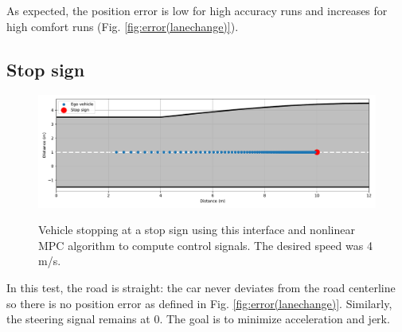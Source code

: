 \documentclass[letterpaper, 10 pt, conference]{ieeeconf}  %
\begin{document}
 As expected, the position error is low for high accuracy runs and increases for high comfort runs (Fig. \ref{fig:error(lanechange)}).
 
 \subsection{Stop sign}
 
 
\begin{figure}[h!]
	\centering
	\includegraphics[width=1.0\linewidth]{figures/stop_sign.pdf}
	\label{fig:stop_sign}
	\caption{Vehicle stopping at a stop sign using this interface and nonlinear MPC algorithm to compute control signals. The desired speed was 4 m/s.}
\end{figure}
 
% 
 In this test, the road is straight: the car never deviates from the road centerline so there is no position error as defined in Fig. \ref{fig:error(lanechange)}. Similarly, the steering signal remains at 0. The goal is to minimize acceleration and jerk.
 
\end{document}
